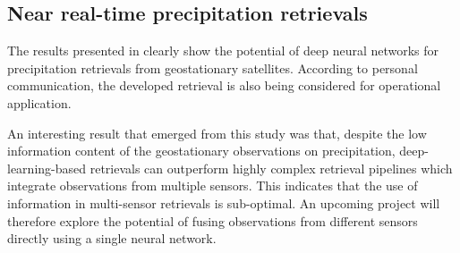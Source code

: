 \subsection{Near real-time precipitation retrievals}

The results presented in \citet{pfreundschuh22b} clearly show the potential of
deep neural networks for precipitation retrievals from geostationary satellites.
According to personal communication, the developed retrieval is also being
considered for operational application.

An interesting result that emerged from this study was that, despite the low
information content of the geostationary observations on precipitation,
deep-learning-based retrievals can outperform highly complex retrieval pipelines
which integrate observations from multiple sensors. This indicates that the use
of information in multi-sensor retrievals is sub-optimal. An upcoming project
will therefore explore the potential of fusing observations from different
sensors directly using a single neural network.

